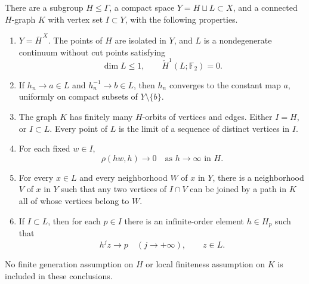 \begin{proposition}\label{block:setting}
There are a subgroup $H\leq\Gamma$, a compact space
$Y=H\sqcup L\subset X$, and a connected $H$-graph $K$ with vertex set
$I\subset Y$, with the following properties.
\begin{enumerate}
\item $Y=\overline H^{\,X}$.  The points of $H$ are isolated in $Y$,
and $L$ is a nondegenerate continuum without cut points satisfying
\[
  \dim L\leq1,
  \qquad \check H^1(L;\mathbb F_2)=0.
\]
\item If $h_n\to a\in L$ and $h_n^{-1}\to b\in L$, then $h_n$
converges to the constant map $a$, uniformly on compact subsets of
$Y\setminus\{b\}$.
\item The graph $K$ has finitely many $H$-orbits of vertices and
edges.  Either $I=H$, or $I\subset L$.  Every point of $L$ is the limit
of a sequence of distinct vertices in $I$.
\item For each fixed $w\in I$,
\begin{equation}\label{block:comparison}
  \rho(hw,h)\longrightarrow0
  \quad\text{as }h\longrightarrow\infty\text{ in }H.
\end{equation}
\item For every $x\in L$ and every neighborhood $W$ of $x$ in $Y$,
there is a neighborhood $V$ of $x$ in $Y$ such that any two vertices
of $I\cap V$ can be joined by a path in $K$ all of whose vertices
belong to $W$.
\item If $I\subset L$, then for each $p\in I$ there is an
infinite-order element $h\in H_p$ such that
\[
  h^jz\longrightarrow p
  \quad(j\longrightarrow+\infty),\qquad z\in L.
\]
\end{enumerate}
No finite generation assumption on $H$ or local finiteness assumption
on $K$ is included in these conclusions.
\end{proposition}

